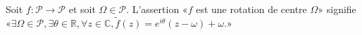 Soit $f:\mathcal P\to \mathcal P$ et soit $\Omega\in\mathcal P$. L'assertion «$f$ est une rotation de centre $\Omega$» signifie «$\exists \Omega\in\mathcal P, \exists \theta\in\mathbb R, \forall z\in\mathbb C, \tilde f(z)=e^{i\theta}(z-\omega)+\omega$.»

\begin{reponses}
\end{reponses}

